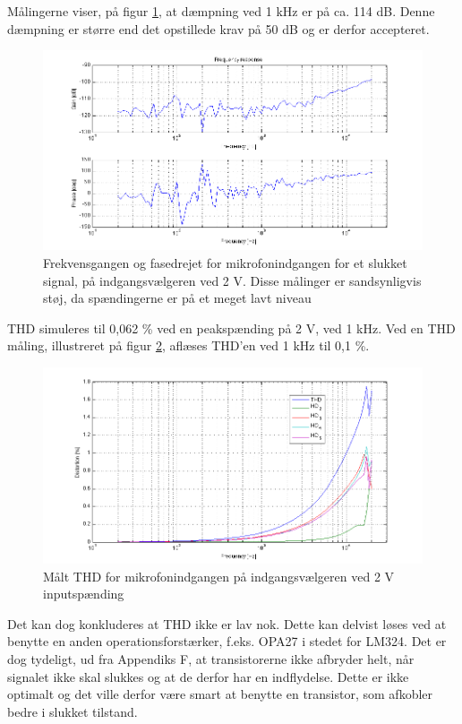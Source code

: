 Målingerne viser, på figur \ref{fig:indaccept:slukketmaaling}, at dæmpning ved 1 kHz er på ca. 114 dB. Denne dæmpning er større end det opstillede krav på 50 dB og er derfor accepteret.
\begin{figure}[h]
\centering
\includegraphics[width=\textwidth]{maalerapporter/indgangsvaelger/Indgangsvlger-mic-2v-slukket-frek.png}
\caption{Frekvensgangen og fasedrejet for mikrofonindgangen for et slukket signal, på indgangsvælgeren ved 2 V. Disse målinger er sandsynligvis støj, da spændingerne er på et meget lavt niveau}
\label{fig:indaccept:slukketmaaling}
\end{figure}	

THD simuleres til 0,062 \% ved en peakspænding på 2 V, ved 1 kHz. Ved en THD måling, illustreret på figur \ref{fig:accind:thd2v}, aflæses THD'en ved 1 kHz til 0,1 \%. 
\begin{figure}[h]
\centering
\includegraphics[width=\textwidth]{maalerapporter/indgangsvaelger/Indgangsvlger-mic-2v-thd.png}
\caption{Målt THD for mikrofonindgangen på indgangsvælgeren ved 2 V inputspænding}
\label{fig:accind:thd2v}
\end{figure}
Det kan dog konkluderes at THD ikke er lav nok. Dette kan delvist løses ved at benytte en anden operationsforstærker, f.eks. OPA27 i stedet for LM324. Det er dog tydeligt, ud fra Appendiks F, at transistorerne ikke afbryder helt, når signalet ikke skal slukkes og at de derfor har en indflydelse. Dette er ikke optimalt og det ville derfor være smart at benytte en transistor, som afkobler bedre i slukket tilstand.